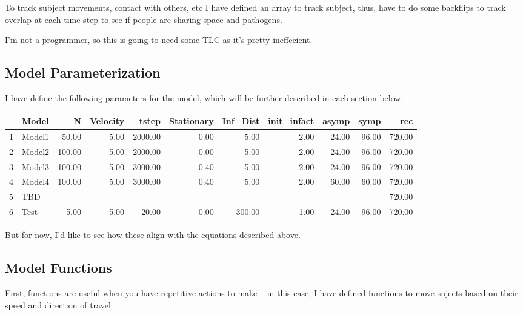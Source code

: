 \documentclass{article}\usepackage[]{graphicx}\usepackage[]{color}
\begin{document}
To track subject movements, contact with others, etc I have defined an array to track subject, thus, have to do some backflips to track overlap at each time step to see if people are sharing space and pathogens. 

I'm not a programmer, so this is going to need some TLC as it's pretty ineffecient. 

\subsection{Model Parameterization}



I have define the following parameters for the model, which will be further described in each section below.

\begin{table}[ht]
\centering
\begin{tabular}{rlrrrrrrrrr}
  \hline
 & Model & N & Velocity & tstep & Stationary & Inf\_Dist & init\_infact & asymp & symp & rec \\ 
  \hline
1 & Model1 & 50.00 & 5.00 & 2000.00 & 0.00 & 5.00 & 2.00 & 24.00 & 96.00 & 720.00 \\ 
  2 & Model2 & 100.00 & 5.00 & 2000.00 & 0.00 & 5.00 & 2.00 & 24.00 & 96.00 & 720.00 \\ 
  3 & Model3 & 100.00 & 5.00 & 3000.00 & 0.40 & 5.00 & 2.00 & 24.00 & 96.00 & 720.00 \\ 
  4 & Model4 & 100.00 & 5.00 & 3000.00 & 0.40 & 5.00 & 2.00 & 60.00 & 60.00 & 720.00 \\ 
  5 & TBD &  &  &  &  &  &  &  &  & 720.00 \\ 
  6 & Test & 5.00 & 5.00 & 20.00 & 0.00 & 300.00 & 1.00 & 24.00 & 96.00 & 720.00 \\ 
   \hline
\end{tabular}
\end{table}


But for now, I'd like to see how these align with the equations described above.

\subsection{Model Functions}

First, functions are useful when you have repetitive actions to make -- in this case, I have defined functions to move sujects based on their speed and direction of travel. 
\end{document}
